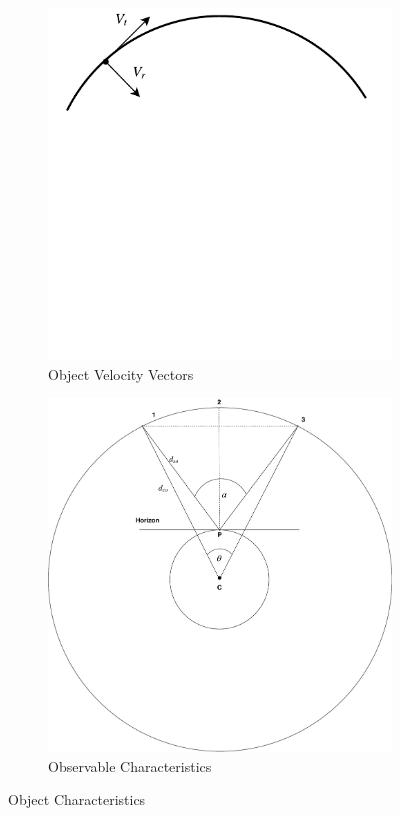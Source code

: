 \documentclass[11pt]{witseiepaper}
\begin{document}
\begin{figure}[htb]
    \centering
    \begin{subfigure}{.5\textwidth}
        \centering
            \includegraphics[width=0.9\linewidth]{Vectors.pdf}
            \caption{Object Velocity Vectors}
            \label{fig:ObjectVelocityVectors}
        \end{subfigure}%
        \begin{subfigure}{.5\textwidth}
            \centering
            \includegraphics[width=0.9\linewidth]{ObservableCharacteristics.pdf}
            \caption{Observable Characteristics}
                \label{fig:ObservableCharacteristics}
            \end{subfigure}
\caption{Object Characteristics}
\label{fig:ObjectCharacteristics}
\end{figure}
\end{document}

